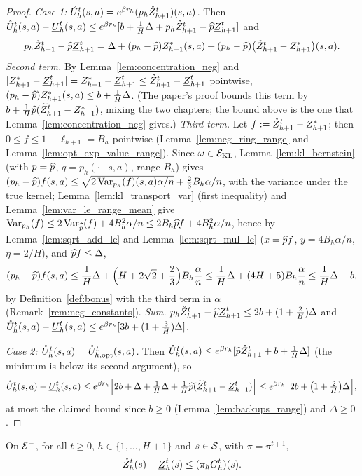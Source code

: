 \begin{proof}
\emph{Case 1: $\mathring{U}_h^t(s,a) = e^{\beta r_h}(p_h\mathring{Z}^t_{h+1})(s,a)$.} Then
$\mathring{U}_h^t(s,a) - \underline{U}_h^t(s,a) \le e^{\beta r_h}[b + \frac1H\Delta + p_h\mathring{Z}^t_{h+1} - \widehat{p}\underline{Z}^t_{h+1}]$ and
\[
  p_h\mathring{Z}^t_{h+1} - \widehat{p}\underline{Z}^t_{h+1}
  = \Delta + (p_h - \widehat{p})Z^*_{h+1}(s,a) + (p_h - \widehat{p})\big(\mathring{Z}^t_{h+1} - Z^*_{h+1}\big)(s,a) .
\]
\emph{Second term.} By Lemma~\ref{lem:concentration_neg} and $\lvert Z^*_{h+1} - \underline{Z}^t_{h+1} \rvert = Z^*_{h+1} - \underline{Z}^t_{h+1} \le \mathring{Z}^t_{h+1} - \underline{Z}^t_{h+1}$
pointwise, $(p_h - \widehat{p})Z^*_{h+1}(s,a) \le b + \frac1H\Delta$. (The paper's proof bounds this term
by $b + \frac1H\widehat{p}(\widetilde{Z}^t_{h+1} - Z^*_{h+1})$, mixing the two chapters; the bound above is the one
that Lemma~\ref{lem:concentration_neg} gives.)
\emph{Third term.} Let $f := \mathring{Z}^t_{h+1} - Z^*_{h+1}$; then $0 \le f \le 1 - \ell_{h+1} = B_h$ pointwise
(Lemma~\ref{lem:neg_ring_range} and Lemma~\ref{lem:opt_exp_value_range}). Since $\omega \in \mathcal{E}_{\mathrm{KL}}$,
Lemma~\ref{lem:kl_bernstein} (with $p = \widehat{p}$, $q = p_h(\cdot \mid s,a)$, range $B_h$) gives
$(p_h - \widehat{p})f(s,a) \le \sqrt{2\operatorname{Var}_{p_h}(f)(s,a)\alpha/n} + \frac23B_h\alpha/n$, with the variance under the
true kernel; Lemma~\ref{lem:kl_transport_var} (first inequality) and
Lemma~\ref{lem:var_le_range_mean} give $\operatorname{Var}_{p_h}(f) \le 2\operatorname{Var}_{\widehat{p}}(f) + 4B_h^2\alpha/n \le 2B_h\widehat{p} f + 4B_h^2\alpha/n$,
hence by Lemma~\ref{lem:sqrt_add_le} and Lemma~\ref{lem:sqrt_mul_le} ($x = \widehat{p} f$, $y = 4B_h\alpha/n$,
$\eta = 2/H$), and $\widehat{p} f \le \Delta$,
\[
  (p_h - \widehat{p})f(s,a) \le \frac1H\Delta + \Big(H + 2\sqrt2 + \frac23\Big)B_h\frac{\alpha}{n}
  \le \frac1H\Delta + (4H + 5)B_h\frac{\alpha}{n} \le \frac1H\Delta + b ,
\]
by Definition~\ref{def:bonus} with the third term in $\alpha$ (Remark~\ref{rem:neg_constants}).
\emph{Sum.} $p_h\mathring{Z}^t_{h+1} - \widehat{p}\underline{Z}^t_{h+1} \le 2b + (1 + \frac2H)\Delta$ and
$\mathring{U}_h^t(s,a) - \underline{U}_h^t(s,a) \le e^{\beta r_h}[3b + (1 + \frac3H)\Delta]$.

\emph{Case 2: $\mathring{U}_h^t(s,a) = \mathring{U}^t_{h,\mathrm{opt}}(s,a)$.} Then
$\mathring{U}_h^t(s,a) \le e^{\beta r_h}[\widehat{p}\mathring{Z}^t_{h+1} + b + \frac1H\Delta]$ (the minimum is below its second
argument), so
\[
  \mathring{U}_h^t(s,a) - \underline{U}_h^t(s,a) \le e^{\beta r_h}\Big[2b + \Delta + \tfrac1H\Delta + \tfrac1H\widehat{p}(\widetilde{Z}^t_{h+1} - \underline{Z}^t_{h+1})\Big]
  \le e^{\beta r_h}\Big[2b + \big(1 + \tfrac2H\big)\Delta\Big] ,
\]
at most the claimed bound since $b \ge 0$ (Lemma~\ref{lem:backups_range}) and $\Delta \ge 0$.
\end{proof}

\begin{lemma}\label{lem:cert_dominates_gap_neg}
\leanok
{}
On $\mathcal{E}^-$, for all $t \ge 0$, $h \in \{1, \dots, H + 1\}$ and $s \in \mathcal{S}$, with $\pi = \pi^{t+1}$,
\[
  \mathring{Z}_h^t(s) - \underline{Z}_h^t(s) \le (\pi_hG_h^t)(s) .
\]
\end{lemma}


